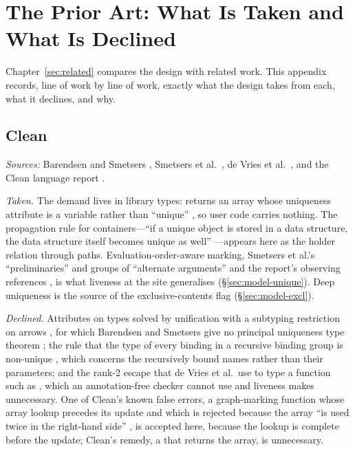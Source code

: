 \chapter{The Prior Art: What Is Taken and What Is Declined}
\label{app:priorart}

Chapter~\ref{sec:related} compares the design with related work. This appendix records, line of
work by line of work, exactly what the design takes from each, what it declines, and why.

\section{Clean}

\emph{Sources:} Barendsen and Smetsers \citep{barendsen1993conventional,barendsen1995inference,barendsen1996uniqueness},
Smetsers et al.\ \citep{smetsers1994guaranteeing}, de Vries et al.\
\citep{devries2007redefined,devries2008simplified}, and the Clean language report
\citep{plasmeijer2011clean}.

\emph{Taken.} The demand lives in library types:  returns an array whose uniqueness
attribute is a variable rather than ``unique'' \citep[\S6]{devries2008simplified}, so user code carries
nothing. The propagation rule for containers---``if a unique object is stored in a data structure, the
data structure itself becomes unique as well'' \citep[\S9.2]{plasmeijer2011clean}---appears here as the
holder relation through paths. Evaluation-order-aware marking, Smetsers et al.'s ``preliminaries'' and
groups of ``alternate arguments'' \citep[\S4]{smetsers1994guaranteeing} and the report's observing references
\citep[\S9.4]{plasmeijer2011clean}, is what liveness at the site generalises (\S\ref{sec:model-unique}).
Deep uniqueness is the source of the exclusive-contents flag (\S\ref{sec:model-excl}).

\emph{Declined.} Attributes on types solved by unification with a subtyping restriction on arrows
\citep[Def.~7.6]{barendsen1996uniqueness}, for which Barendsen and Smetsers give no principal
uniqueness type theorem \citep[\S8]{barendsen1996uniqueness}; the rule that the type of every binding in
a recursive binding group is non-unique \citep[\S7]{devries2008simplified}, which concerns the
recursively bound names rather than their parameters; and the rank-2 escape that de Vries et al.\ use to
type a function such as \code{if isEmpty arr then shrink arr else grow arr}
\citep[\S6]{devries2008simplified}, which an annotation-free checker cannot use and liveness makes
unnecessary. One of Clean's known false errors, a graph-marking function whose array lookup precedes its
update and which is rejected because the array ``is used twice in the right-hand side''
\citep[\S6]{barendsen1995inference}, is accepted here, because the lookup is complete before the update;
Clean's remedy, a \code{lookup} that returns the array, is unnecessary.

